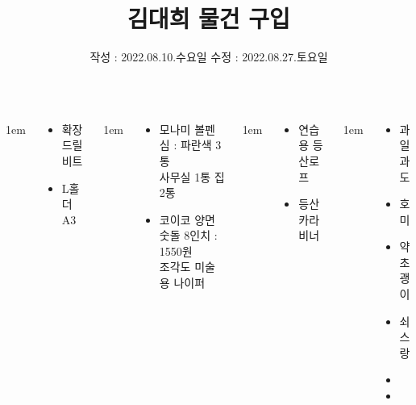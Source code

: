 \documentclass[	20pt, 
							a1paper, 
							portrait, %
							margin=0mm, %
							innermargin=10mm,  		%
							colspace=5mm, 
							subcolspace=0mm
							]{tikzposter}
\title{김대희 물건 구입}
\author{ 	작성 : 2022.08.10.수요일 	수정 : 2022.08.27.토요일 	}
\begin{document}
	\maketitle

	\begin{columns}


			{
					\setlength{\leftmargini}{4em}
					\setlength{\labelsep} {1em}
				\begin{LARGE}
					\begin{itemize}
					\item 확장 드릴 비트
					\item L홀더 A3
					\end{itemize}
				\end{LARGE}
			}


			{
					\setlength{\leftmargini}{4em}
					\setlength{\labelsep} {1em}
				\begin{LARGE}
					\begin{itemize}
					\item 모나미 볼펜 심 : 파란색 3통\\
							사무실 1통 집2통
					\item 코이코 양면 숫돌 8인치 : 1550원 \\
						조각도  미술용 나이퍼
					\end{itemize}
				\end{LARGE}
			}


			{
					\setlength{\leftmargini}{4em}
					\setlength{\labelsep} {1em}
				\begin{LARGE}
					\begin{itemize}
					\item 연습용 등산로프
					\item 등산 카라 비너
					\end{itemize}
				\end{LARGE}
			}






			{
					\setlength{\leftmargini}{4em}
					\setlength{\labelsep} {1em}
				\begin{LARGE}
					\begin{itemize}
					\item 과일 과도
					\item 호미
					\item 약초괭이
					\item 쇠스랑
					\item 
					\item 
					\end{itemize}
				\end{LARGE}
			}


\end{columns}
\end{document}
